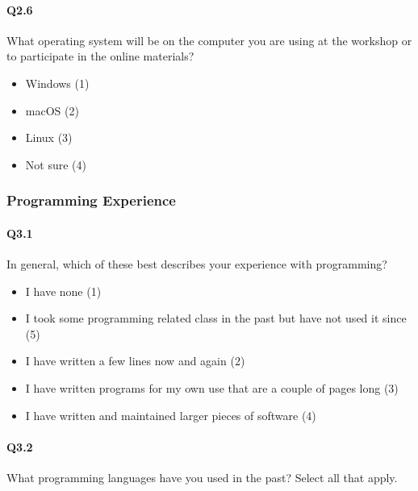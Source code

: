 \documentclass[020-persona\_validation.tex]{subfiles}
\begin{document}
        \paragraph{Q2.6}

            What operating system will be on the computer you are using at the workshop or to participate in the online materials?

            \begin{itemize}
                \item Windows  (1)
                \item macOS  (2)
                \item Linux  (3)
                \item Not sure  (4)
            \end{itemize}

    \subsubsection{Programming Experience}

        \paragraph{Q3.1}

            In general, which of these best describes your experience with programming?

            \begin{itemize}
                \item I have none  (1)
                \item I took some programming related class in the past but have not used it since  (5)
                \item I have written a few lines now and again  (2)
                \item I have written programs for my own use that are a couple of pages long  (3)
                \item I have written and maintained larger pieces of software  (4)
            \end{itemize}

        \paragraph{Q3.2}

            What programming languages have you used in the past? Select all that apply.
\end{document}

